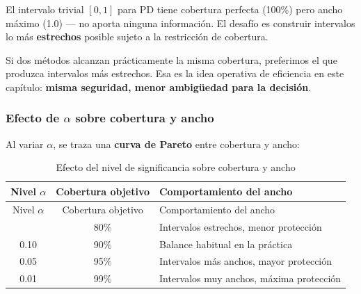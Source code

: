 \documentclass[
  spanish,
  11pt,
  letterpaper,
]{scrbook}
\theoremstyle{plain}
\theoremstyle{remark}
\begin{document}
El intervalo trivial \([0, 1]\) para PD tiene cobertura perfecta (100\%)
pero ancho máximo (1.0) --- no aporta ninguna información. El desafío es
construir intervalos lo más \textbf{estrechos} posible sujeto a la
restricción de cobertura.

Si dos métodos alcanzan prácticamente la misma cobertura, preferimos el
que produzca intervalos más estrechos. Esa es la idea operativa de
eficiencia en este capítulo: \textbf{misma seguridad, menor ambigüedad
para la decisión}.

\subsubsection{\texorpdfstring{Efecto de \(\alpha\) sobre cobertura y
ancho}{Efecto de \textbackslash alpha sobre cobertura y ancho}}\label{sec-alpha-effect}

Al variar \(\alpha\), se traza una \textbf{curva de Pareto} entre
cobertura y ancho:

\begin{longtable}[]{@{}ccl@{}}
\caption{Efecto del nivel de significancia sobre cobertura y
ancho}\label{tbl-alpha-effect}\tabularnewline
\toprule\noalign{}
Nivel \(\alpha\) & Cobertura objetivo & Comportamiento del ancho \\
\midrule\noalign{}
\endfirsthead
\toprule\noalign{}
Nivel \(\alpha\) & Cobertura objetivo & Comportamiento del ancho \\
\midrule\noalign{}
\endhead
\bottomrule\noalign{}
\endlastfoot
0.20 & 80\% & Intervalos estrechos, menor protección \\
0.10 & 90\% & Balance habitual en la práctica \\
0.05 & 95\% & Intervalos más anchos, mayor protección \\
0.01 & 99\% & Intervalos muy anchos, máxima protección \\
\end{longtable}
\end{document}
